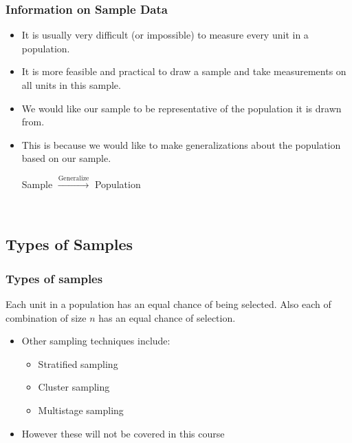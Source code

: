 \documentclass[xcolor=svgnames, compress]{beamer}
\begin{document}
\begin{frame}
\frametitle{Information on Sample Data} 

\vspace{-0.5cm}

\begin{itemize}\justifying
\item	It is usually very difficult (or impossible) to measure every unit in a population.\\[1.00em]
\item	It is more feasible and practical to draw a sample and take measurements on all units in this sample.\\[1.00em]
\item	We would like our sample to be representative of the population it is drawn from.\\[1.00em]
\item	This is because we would like to make generalizations about the population based on our sample.\\

\vspace{0.25cm}

\begin{center}
Sample	\quad	$\xrightarrow{\text{Generalize}}$ \quad Population
\end{center}
\hfill\\


\end{itemize}

\end{frame}


\subsection*{Types of Samples}

\begin{frame}
\frametitle{Types of samples}

\vspace{-0.50cm}


\begin{definition}
\justifying
Each unit in a population has an equal chance of being selected.
Also each of combination of size $n$ has an equal chance of selection.
\end{definition}

\vspace{0.25cm}

\begin{itemize}
\item	Other sampling techniques include:
	\begin{itemize}\justifying
	\item	Stratified sampling
	\item	Cluster sampling
	\item	Multistage sampling
	\end{itemize}
\vspace{0.25cm}
\item	However these will not be covered in this course
\end{itemize}

\end{frame}
\end{document}
